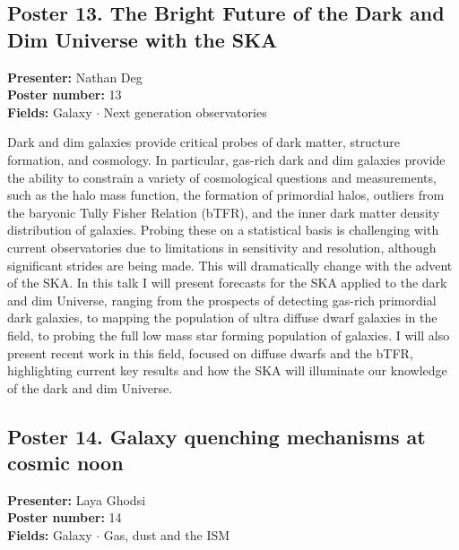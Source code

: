 \hypertarget{poster-abstract-talk-45}{}\label{poster-abstract-page-talk-45}
\subsection*{Poster 13. The Bright Future of the Dark and Dim Universe with the SKA}
\textbf{Presenter:} Nathan Deg\\
\textbf{Poster number:} 13\\
\textbf{Fields:} Galaxy $\cdot$ Next generation observatories

Dark and dim galaxies provide critical probes of dark matter, structure formation, and cosmology. In particular, gas-rich dark and dim galaxies provide the ability to constrain a variety of cosmological questions and measurements, such as the halo mass function, the formation of primordial halos, outliers from the baryonic Tully Fisher Relation (bTFR), and the inner dark matter density distribution of galaxies. Probing these on a statistical basis is challenging with current observatories due to limitations in sensitivity and resolution, although significant strides are being made. This will dramatically change with the advent of the SKA. In this talk I will present forecasts for the SKA applied to the dark and dim Universe, ranging from the prospects of detecting gas-rich primordial dark galaxies, to mapping the population of ultra diffuse dwarf galaxies in the field, to probing the full low mass star forming population of galaxies. I will also present recent work in this field, focused on diffuse dwarfs and the bTFR, highlighting current key results and how the SKA will illuminate our knowledge of the dark and dim Universe.

\hypertarget{poster-abstract-talk-297}{}\label{poster-abstract-page-talk-297}
\subsection*{Poster 14. Galaxy quenching mechanisms at cosmic noon}
\textbf{Presenter:} Laya Ghodsi\\
\textbf{Poster number:} 14\\
\textbf{Fields:} Galaxy $\cdot$ Gas, dust and the ISM

